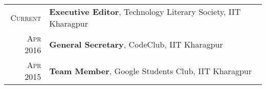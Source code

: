 \documentclass[a4paper,10pt]{extarticle} %
\begin{document}
\begin{tabular}{r|p{15cm}}
\textsc{Current} & \textbf{Executive Editor}, Technology Literary Society, IIT Kharagpur \\
\textsc{Apr 2016} & \textbf{General Secretary}, CodeClub, IIT Kharagpur \\
\textsc{Apr 2015} & \textbf{Team Member}, Google Students Club, IIT Kharagpur
\end{tabular}


\end{document}
